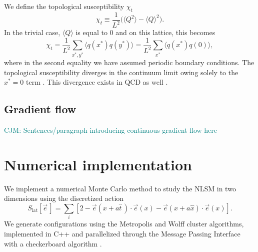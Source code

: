 \documentclass[a4paper,11pt]{article}
\newcommand{\e}{\vec e}
\newcommand\chris[1]{\textcolor{teal}{CJM: #1}}
\begin{document}
We define the topological susceptibility $\chi_t$
\begin{equation}
\chi_t \equiv \frac{1}{L^2} \Big( \langle Q^2 \rangle - \langle Q \rangle^2 \Big).
\end{equation}
In the trivial case, $\langle Q \rangle$ is equal to $0$ and on this lattice, this becomes   
\begin{equation}
    \chi_t = \frac{1}{L^2} \sum_{x^*,y^*} \langle q(x^*)q(y^*)\rangle  = \frac{1}{L^2} \sum_{x^*} \langle q(x^*)q(0)\rangle,
\end{equation}
where in the second equality we have assumed periodic boundary conditions. The topological susceptibility diverges in the continuum limit owing solely to the $x^*=0$ term \cite{bietenholz2018}. This divergence exists in QCD as well \cite{bruno2014}.



\subsection{Gradient flow}

\chris{Sentences/paragraph introducing continuous gradient flow here}

\section{Numerical implementation}
We implement a numerical Monte Carlo method to study the NLSM in two dimensions using the discretized action
\begin{equation}
    \label{eq:nlsm discretized action}
    S_\mathrm{lat}[\e\,] = \sum_i \left[ 2 - \e(x+a\hat{t}\,)\cdot\e(x) - \e(x+a\hat{x})\cdot\e(x) \right].
\end{equation}
We generate configurations using the Metropolis \cite{} and Wolff cluster \cite{wolff1989} algorithms, implemented in C++ and parallelized through the Message Passing Interface with a checkerboard algorithm \cite{}. 
\end{document}
